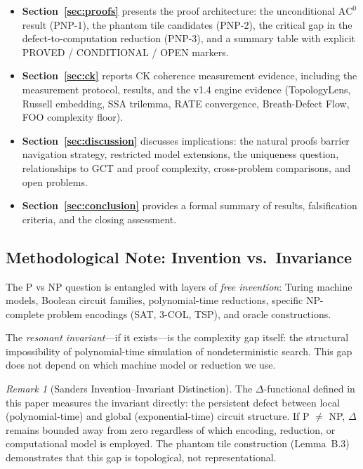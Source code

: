 \documentclass[11pt]{article}
\theoremstyle{definition}
\theoremstyle{remark}
\newtheorem{remark}[theorem]{Remark}
\newcommand{\ACz}{\mathrm{AC}^0}
\begin{document}
\begin{itemize}[nosep]
  \item \textbf{Section~\ref{sec:proofs}} presents the proof architecture:
    the unconditional $\ACz$ result (PNP-1), the phantom tile candidates
    (PNP-2), the critical gap in the defect-to-computation reduction (PNP-3),
    and a summary table with explicit PROVED / CONDITIONAL / OPEN markers.

  \item \textbf{Section~\ref{sec:ck}} reports CK coherence measurement
    evidence, including the measurement protocol, results, and the v1.4
    engine evidence (TopologyLens, Russell embedding, SSA trilemma, RATE
    convergence, Breath-Defect Flow, FOO complexity floor).

  \item \textbf{Section~\ref{sec:discussion}} discusses implications: the
    natural proofs barrier navigation strategy, restricted model extensions,
    the uniqueness question, relationships to GCT and proof complexity,
    cross-problem comparisons, and open problems.

  \item \textbf{Section~\ref{sec:conclusion}} provides a formal summary of
    results, falsification criteria, and the closing assessment.
\end{itemize}

\subsection*{Methodological Note: Invention vs.\ Invariance}

The P vs NP question is entangled with layers of \emph{free invention}: Turing machine
models, Boolean circuit families, polynomial-time reductions, specific NP-complete
problem encodings (SAT, 3-COL, TSP), and oracle constructions.

The \emph{resonant invariant}---if it exists---is the complexity gap itself: the
structural impossibility of polynomial-time simulation of nondeterministic search.
This gap does not depend on which machine model or reduction we use.

\begin{remark}[Sanders Invention--Invariant Distinction]
The $\Delta$-functional defined in this paper measures the invariant directly:
the persistent defect between local (polynomial-time) and global (exponential-time)
circuit structure. If P $\neq$ NP, $\Delta$ remains bounded away from zero
regardless of which encoding, reduction, or computational model is employed.
The phantom tile construction (Lemma~B.3) demonstrates that this gap is
topological, not representational.
\end{remark}
\end{document}
